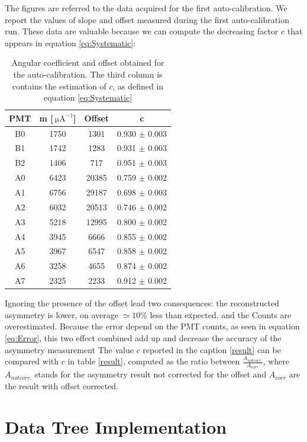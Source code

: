 The figures are referred to the data acquired for the first auto-calibration. We report the values of slope and offset measured during the first auto-calibration run. These data are valuable because we can compute the decreasing factor $c$ that appears in equation \ref{eq:Systematic}:
\begin{table}[h]
\centering
\begin{tabular}{c|c|c|c}
\hline
 PMT & m [$\SI{}{\micro \ampere}^{-1}$] & Offset & c  \\
\hline
 B0  & 1750 &  1301 &  0.930 $\pm$ 0.003\\
 B1  & 1742 &  1283 &  0.931 $\pm$ 0.003\\
 B2  & 1406 &   717 &  0.951 $\pm$ 0.003\\
 A0  & 6423 & 20385 &  0.759 $\pm$ 0.002\\
 A1  & 6756 & 29187 &  0.698 $\pm$ 0.003\\
 A2  & 6032 & 20513 &  0.746 $\pm$ 0.002\\
 A3  & 5218 & 12995 &  0.800 $\pm$ 0.002\\
 A4  & 3945 &  6666 &  0.855 $\pm$ 0.002\\
 A5  & 3967 &  6547 &  0.858 $\pm$ 0.002\\
 A6  & 3258 &  4655 &  0.874 $\pm$ 0.002\\
 A7  & 2325 &  2233 &  0.912 $\pm$ 0.002\\
\hline
\end{tabular}
\caption{Angular coefficient and offset obtained for the auto-calibration. The third column is contains the estimation of $c$, as defined in equation \ref{eq:Systematic}}
\label{table:PMToffset}
\end{table}

Ignoring the presence of the offset lead two consequences: the reconstructed asymmetry is lower, on average $ \simeq 10\%$ less than expected, and the Counts are overestimated. Because the error depend on the PMT counts, as seen in equation \ref{eq:Error}, this two effect combined add up and decrease the accuracy of the asymmetry measurement
The value $c$ reported in the caption \ref{result} can be compared with $c$ in table \ref{result}, computed as the ratio between $\frac{A_{not corr.}}{A_{corr}}$, where $A_{not corr.}$ stands for the asymmetry result not corrected for the offset and $A_{corr}$ are the result with offset corrected. 

\section{Data Tree Implementation}


